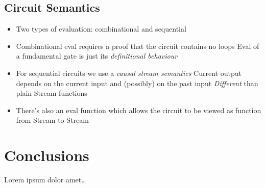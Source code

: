 \documentclass[a4paper]{article}
\begin{document}
        \subsection{Circuit Semantics}
        \label{subsec:eval-seq}
            \begin{itemize}
                \item Two types of evaluation: combinational and sequential
                \item Combinational eval requires a proof that the circuit contains no loops
                    \subitem Eval of a fundamental gate is just its \emph{definitional behaviour}

                \item For sequential circuits we use a \emph{causal stream semantics}
                    \subitem Current output depends on the current input and (possibly) on the past input
                    \subitem \emph{Different} than plain Stream functions

                \item There's also an eval function which allows the circuit to be viewed as function from Stream to Stream
            \end{itemize}


    \section{Conclusions}
    \label{sec:conclusions}
        Lorem ipsum dolor amet\ldots


    \newpage
    
    
\end{document}
